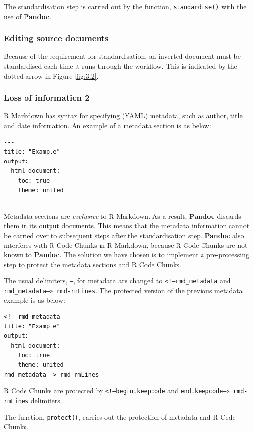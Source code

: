 \documentclass[a4paper, 12pt]{report}
\begin{document}
The standardisation step is carried out by the function, \texttt{standardise()} with the use of \textbf{Pandoc}.


\subsubsection*{Editing source documents}
Because of the requirement for standardisation, an inverted document must be standardised each time it runs through the workflow. This is indicated by the dotted arrow in Figure \ref{fig:3.2}.


\subsubsection*{Loss of information 2}
R Markdown has syntax for specifying (YAML) metadata, such as author, title and date information. An example of a metadata section is as below:
\begin{lstlisting}[numbers=none, frame=none]
---
title: "Example"
output:
  html_document:
    toc: true
    theme: united
---
\end{lstlisting}

Metadata sections are \emph{exclusive} to R Markdown. As a result, \textbf{Pandoc} discards them in its output documents. This means that the metadata information cannot be carried over to subsequent steps after the standardisation step. \textbf{Pandoc} also interferes with R Code Chunks in R Markdown, because R Code Chunks are not known to \textbf{Pandoc}.  The solution we have chosen is to implement a pre-processing step to protect the metadata sections and R Code Chunks.

The usual delimiters, \texttt{---}, for metadata are changed to \texttt{<!--rmd\_metadata} and \texttt{rmd\_metadata--> rmd-rmLines}. The protected version of the previous metadata example is as below:
\begin{lstlisting}[numbers=none, frame=none]
<!--rmd_metadata
title: "Example"
output:
  html_document:
    toc: true
    theme: united
rmd_metadata--> rmd-rmLines
\end{lstlisting}

R Code Chunks are protected by \texttt{<!--begin.keepcode} and \texttt{end.keepcode--> rmd-rmLines} delimiters.

The function, \texttt{protect()}, carries out the protection of metadata and R Code Chunks.
\end{document}
